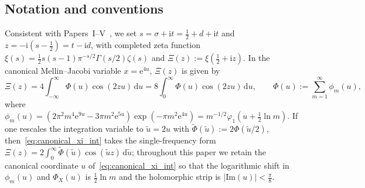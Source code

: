 \documentclass[11pt,reqno]{amsart}
\theoremstyle{definition}
\theoremstyle{remark}
\numberwithin{equation}{section}
\newcommand{\dd}{\mathrm{d}}
\newcommand{\ee}{\mathrm{e}}
\newcommand{\ii}{\mathrm{i}}
\newcommand{\Ima}{\mathrm{Im}}
\begin{document}
\subsection{Notation and conventions}\label{subsec:notation}

Consistent with Papers~I--V~\cite{missiaen2026paper1,missiaen2026paper5}, we set $s = \sigma + \ii t = \frac{1}{2} + d + \ii t$ and $z = -\ii(s - \frac{1}{2}) = t - \ii d$, with completed zeta function $\xi(s) = \frac{1}{2}s(s-1)\pi^{-s/2}\Gamma(s/2)\zeta(s)$ and $\Xi(z) := \xi(\frac{1}{2}+\ii z)$. In the canonical Mellin--Jacobi variable $x = \ee^{4u}$, $\Xi(z)$ is given by
\begin{equation}\label{eq:canonical_xi_int}
\Xi(z) = 4\int_{-\infty}^{\infty} \Phi(u)\cos(2zu)\,\dd u = 8\int_0^{\infty} \Phi(u)\cos(2zu)\,\dd u, \qquad \Phi(u) := \sum_{m=1}^{\infty} \phi_m(u),
\end{equation}
where $\phi_m(u) = (2\pi^2 m^4\ee^{9u} - 3\pi m^2\ee^{5u})\exp(-\pi m^2\ee^{4u}) = m^{-1/2}\varphi_1(u + \frac{1}{2}\ln m)$. If one rescales the integration variable to $\tilde{u} = 2u$ with $\widetilde{\Phi}(\tilde{u}) := 2\Phi(\tilde{u}/2)$, then~\eqref{eq:canonical_xi_int} takes the single-frequency form $\Xi(z) = 2\int_0^{\infty} \widetilde{\Phi}(\tilde{u})\cos(\tilde{u}z)\,\dd\tilde{u}$; throughout this paper we retain the canonical coordinate $u$ of~\eqref{eq:canonical_xi_int} so that the logarithmic shift in $\phi_m(u)$ and $\Phi_X(u)$ is $\frac{1}{2}\ln m$ and the holomorphic strip is $|\Ima(u)| < \frac{\pi}{8}$.
\end{document}

